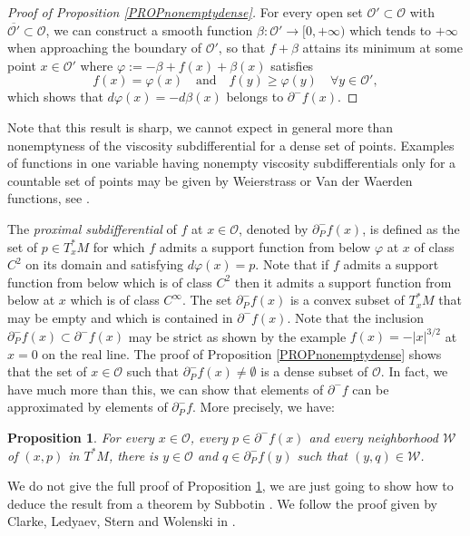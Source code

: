 \documentclass[JEP,XML,SOM,Unicode,NoFloatCountersInSection,published]{cedram}
\newtheorem{proposition}[theorem]{Proposition}
\theoremstyle{definition}
\begin{document}
\begin{proof}[Proof of Proposition \ref{PROPnonemptydense}]
For every open set $\mathcal{O}' \subset \mathcal{O}$ with $\overline{\mathcal{O}'}\subset \mathcal{O}$, we can construct a smooth function $\beta:\mathcal{O}' \to [0,+\infty)$ which tends to $+\infty$ when approaching the boundary of $\mathcal{O}'$, so that $f+\beta$ attains its minimum at some point $x\in \mathcal{O}'$ where $\varphi := -\beta + f(x)+\beta(x)$ satisfies
\[
f(x) = \varphi(x) \quad \text{and} \quad f(y) \geq \varphi(y) \quad \forall y \in \mathcal{O}',
\]
which shows that $d\varphi(x)=-d\beta(x)$ belongs to $\partial^-f(x)$.
\end{proof}

Note that this result is sharp, we cannot expect in general more than nonemptyness of the viscosity subdifferential for a dense set of points. Examples of functions in one variable having nonempty viscosity subdifferentials only for a countable set of points may be given by Weierstrass or Van der Waerden functions, see \cite{gs11}.

The {\it proximal subdifferential} of $f$ at $x\in \mathcal{O}$, denoted by $\partial^-_P f(x)$, is defined as the set of $p\in T_x^*M$ for which $f$ admits a support function from below $\varphi$ at $x$ of class~$C^{2}$ on its domain and satisfying $d\varphi(x)=p$. Note that if $f$ admits a support function from below which is of class $C^2$ then it admits a support function from below at $x$ which is of class $C^{\infty}$. The set $\partial_P^-f(x)$ is a convex subset of $T_x^*M$ that may be empty and which is contained in $\partial^-f(x)$. Note that the inclusion $\partial_P^-f(x)\subset \partial^-f(x)$ may be strict as shown by the example $f(x)=-|x|^{3/2}$ at $x=0$ on the real line. The proof of Proposition \ref{PROPnonemptydense} shows that the set of $x\in \mathcal{O}$ such that $\partial_P^-f(x)\neq \emptyset$ is a dense subset of $\mathcal{O}$. In fact, we have much more than this, we can show that elements of $\partial^-f$ can be approximated by elements of $\partial^-_Pf$. More precisely, we have:

\begin{proposition}\label{PROPidem}
For every $x\in \mathcal{O}$, every $p\in \partial^-f(x)$ and every neighborhood $\mathcal{W}$ of $(x,p)$ in $T^*M$, there is $y \in \mathcal{O}$ and $q\in \partial^-_P f(y)$ such that $(y,q)\in \mathcal{W}$.
\end{proposition}

We do not give the full proof of Proposition \ref{PROPidem}, we are just going to show how to deduce the result from a theorem by Subbotin \cite{subbotin95}. We follow the proof given by Clarke, Ledyaev, Stern and Wolenski in \cite[Prop.\,4.5, p.\,138]{clsw98}.
\end{document}
